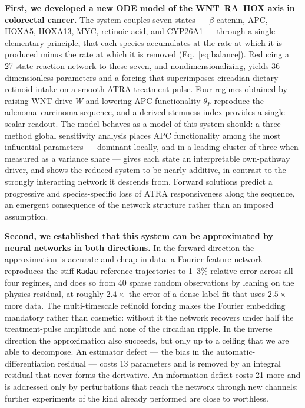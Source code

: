 \documentclass[11pt]{article}
\newcommand{\bcat}{$\beta$-\hspace{0pt}catenin}
\newcommand{\thP}{\theta_P}
\begin{document}
\textbf{First, we developed a new ODE model of the WNT--RA--HOX axis in
colorectal cancer.} The system couples seven states --- \bcat{}, APC, HOXA5,
HOXA13, MYC, retinoic acid, and CYP26A1 --- through a single elementary
principle, that each species accumulates at the rate at which it is produced
minus the rate at which it is removed (Eq.~\eqref{eq:balance}). Reducing a
27-state reaction network to these seven, and nondimensionalizing, yields 36
dimensionless parameters and a forcing that superimposes circadian dietary
retinoid intake on a smooth ATRA treatment pulse. Four regimes obtained by
raising WNT drive $W$ and lowering APC functionality $\thP$ reproduce the
adenoma--carcinoma sequence, and a derived stemness index provides a single
scalar readout. The model behaves as a model of this system should: a
three-method global sensitivity analysis places APC functionality among the most
influential parameters --- dominant locally, and in a leading cluster of three
when measured as a variance share --- gives each state an interpretable
own-pathway driver, and shows the reduced system to be nearly additive, in
contrast to the strongly interacting network it descends from. Forward solutions
predict a progressive and species-specific loss of ATRA responsiveness along the
sequence, an emergent consequence of the network structure rather than an
imposed assumption.

\textbf{Second, we established that this system can be approximated by neural
networks in both directions.} In the forward direction the approximation is
accurate and cheap in data: a Fourier-feature network reproduces the stiff
\texttt{Radau} reference trajectories to 1--3\% relative error across all four
regimes, and does so from 40 sparse random observations by leaning on the
physics residual, at roughly $2.4\times$ the error of a dense-label fit that
uses $2.5\times$ more data. The multi-timescale retinoid forcing makes the
Fourier embedding mandatory rather than cosmetic: without it the network
recovers under half the treatment-pulse amplitude and none of the circadian
ripple. In the inverse direction the approximation also succeeds, but only up to
a ceiling that we are able to decompose. An estimator defect --- the bias in the
automatic-differentiation residual --- costs 13 parameters and is removed by an
integral residual that never forms the derivative. An information deficit costs
21 more and is addressed only by perturbations that reach the network through
new channels; further experiments of the kind already performed are close to
worthless.
\end{document}
